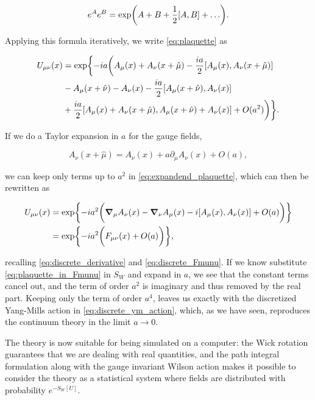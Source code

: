 \documentclass[reqno,12pt]{article}
\numberwithin{equation}{section}
\begin{document}
\begin{equation}
	e^A e^B = \exp(A + B + \frac{1}{2}\qty[A, B] + \dots).
\end{equation}

Applying this formula iteratively, we write \eqref{eq:plaquette} as 

\begin{equation} \label{eq:expandend_plaquette}
	\begin{aligned}
		U_{\mu\nu}(x) &= \exp \biggl\{ -ia\biggl( A_\mu(x) + A_\nu(x + \hat{\mu}) - \frac{ia}{2}\qty[A_\mu(x), A_\nu(x+\hat\mu)] \\
		&- A_\mu(x + \hat\nu) - A_\nu(x) - \frac{ia}{2}\qty[A_\mu(x + \hat\nu), A_\nu(x)] \\
		&+ \frac{ia}{2}\qty[A_\mu(x) + A_\nu(x+\hat\mu), A_\mu(x + \hat\nu) + A_\nu(x)] + O(a^2) \biggr) \biggr\}.
	\end{aligned}
\end{equation}

If we do a Taylor expansion in $a$ for the gauge fields,

\begin{equation}
	A_\nu(x + \hat\mu) = A_\nu(x) + a \partial_\mu A_\nu(x) + O(a),
\end{equation}

we can keep only terms up to $a^2$ in \eqref{eq:expandend_plaquette}, which can then be rewritten as

\begin{equation} \label{eq:plaquette_in_Fmunu}
	\begin{aligned}
		U_{\mu\nu}(x) &= \exp{-ia^2\biggl( \grad_\mu A_\nu(x) - \grad_\nu A_\mu(x) - i\qty[A_\mu(x), A_\nu(x)] + O(a) \biggr)} \\
		&= \exp{-ia^2 \biggl(F_{\mu\nu}(x) + O(a)\biggr)},
	\end{aligned}
\end{equation}

recalling \eqref{eq:discrete_derivative} and \eqref{eq:discrete_Fmunu}. If we know substitute \eqref{eq:plaquette_in_Fmunu}
in $S_W$ and expand in $a$, we see that the constant terms cancel out, and the term of order $a^2$ is imaginary and thus removed by
the real part. Keeping only the term of order $a^4$, leaves us exactly with the discretized Yang-Mills action in 
\eqref{eq:discrete_ym_action}, which, as we have seen, reproduces the continuum theory in the limit $a \rightarrow 0$.

The theory is now suitable for being simulated on a computer: the Wick rotation guarantees that we are dealing with
real quantities, and the path integral formulation along with the gauge invariant Wilson action makes it possible
to consider the theory as a statistical system where fields are distributed with probability $e^{-S_W[U]}$.
\end{document}
